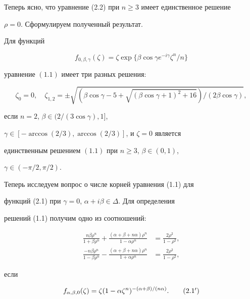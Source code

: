 Теперь ясно, что уравнение (2.2) при $n\ge 3$ имеет единственное решение


$\rho=0$. Сформулируем полученный результат.





\begin{thm}


Для функций


$$


f_{0,\beta,\gamma}(\zeta)=\zeta \exp\{\beta\cos\gamma e^{-i\gamma}\zeta^n/n\}


$$


уравнение $(1.1)$ имеет три разных решения\/${:}$


$$


\zeta_0=0,\quad \zeta_{1,2}=\pm\sqrt{(\beta\cos\gamma-5+\sqrt


{(\beta\cos\gamma+1)^2+16})/(2\beta\cos\gamma)},


$$


если $n=2$, $\beta\in(2/(3\cos\gamma),1]$,


$\gamma\in[-\arccos(2/3),\arccos(2/3)]$, и $\zeta=0$ является


единственным решением $(1.1)$ при $n\ge 3$, $\beta\in(0,1)$,


$\gamma\in(-\pi/2,\pi/2)$.


\end{thm}





Теперь исследуем вопрос о числе корней уравнения (1.1) для


функций (2.1) при $\gamma=0$, $\alpha+i\beta\in\Delta$. Для определения


решений (1.1) получим одно из соотношений:


\begin{align}


\frac{n\beta\rho^n}{1+\beta\rho^n}+\frac{(\alpha+\beta+n\alpha)\rho^n}


{1-\alpha\rho^n}&=\frac{2\rho^2}{1-\rho^2}, \\


%


\frac{-n\beta\rho^n}{1-\beta\rho^n}-\frac{(\alpha+\beta+n\alpha)\rho^n}


{1+\alpha\rho^n}&=\frac{2\rho^2}{1-\rho^2},


\end{align}


если


\begin{equation}


f_{\alpha,\beta,0}(\zeta)=\zeta(1-\alpha\zeta^n)^{-(\alpha+\beta)/


(n\alpha)}.\tag{2.1${}'$}


\end{equation}





